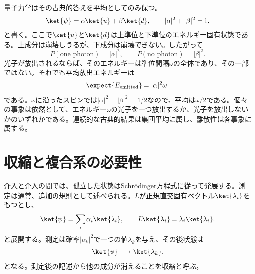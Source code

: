量子力学はその古典的答えを平均としてのみ保つ。
\begin{equation}
\ket{\psi}=\alpha\ket{u}+\beta\ket{d},
\qquad
|\alpha|^2+|\beta|^2=1,
\label{eq:l6-superposed-spin}
\end{equation}
と書く。ここで\(\ket{u}\)と\(\ket{d}\)は上準位と下準位のエネルギー固有状態である。上成分は崩壊しうるが、下成分は崩壊できない。したがって
\begin{equation}
P(\text{one photon})=|\alpha|^2,
\qquad
P(\text{no photon})=|\beta|^2.
\end{equation}
光子が放出されるならば、そのエネルギーは準位間隔\(\omega\)の全体であり、その一部ではない。それでも平均放出エネルギーは
\begin{equation}
\expect{E_{\rm emitted}}=|\alpha|^2\omega.
\end{equation}
である。\(x\)に沿ったスピンでは\(|\alpha|^2=|\beta|^2=1/2\)なので、平均は\(\omega/2\)である。個々の事象は依然として、エネルギー\(\omega\)の光子を一つ放出するか、光子を放出しないかのいずれかである。連続的な古典的結果は集団平均に属し、離散性は各事象に属する。

\begin{classroomqa}
\end{classroomqa}

\begin{classroomqa}
\end{classroomqa}

\section{収縮と複合系の必要性}

介入と介入の間では、孤立した状態はSchr\"odinger方程式に従って発展する。測定は通常、追加の規則として述べられる。\(L\)が正規直交固有ベクトル\(\ket{\lambda_i}\)をもつとし、
\begin{equation}
\ket{\psi}=\sum_i\alpha_i\ket{\lambda_i},
\qquad
L\ket{\lambda_i}=\lambda_i\ket{\lambda_i}.
\label{eq:l6-measurement-expansion}
\end{equation}
と展開する。測定は確率\(|\alpha_k|^2\)で一つの値\(\lambda_k\)を与え、その後状態は
\begin{equation}
\ket{\psi}\longrightarrow\ket{\lambda_k}.
\label{eq:l6-collapse}
\end{equation}
となる。測定後の記述から他の成分が消えることを収縮と呼ぶ。

